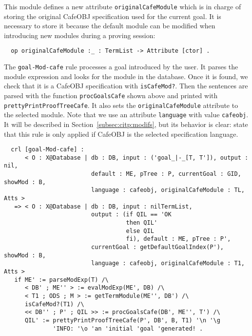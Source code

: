 This module defines a new attribute \verb"originalCafeModule" which is in charge of
storing the original CafeOBJ specification used for the current goal. It is necessary
to store it because the default module can be modified when introducing new modules
during a proving session:

{\codesize
\begin{verbatim}
  op originalCafeModule :_ : TermList -> Attribute [ctor] .
\end{verbatim}
}

The \verb"goal-Mod-cafe" rule processes a goal introduced by the user. It parses the
module expression and looks for the module in the database. Once it is found, we
check that it is a CafeOBJ specification with \verb"isCafeMod?". Then the sentences
are parsed with the function \verb"procGoalsCafe" shown above and printed with
\verb"prettyPrintProofTreeCafe". It also sets the \texttt{originalCafeModule}
attribute to the selected module.
%
Note that we use an attribute \verb"language" with value \texttt{cafeobj}. It will be
described in Section~\ref{subsec:citp:modifs}, but its behavior is clear: state that
this rule is only applied if CafeOBJ is the selected specification language.


{\codesize
\begin{verbatim}
  crl [goal-Mod-cafe] :
      < O : X@Database | db : DB, input : ('goal_|-_[T, T']), output : nil,
                         default : ME, pTree : P, currentGoal : GID, showMod : B,
                         language : cafeobj, originalCafeModule : TL, Atts >
   => < O : X@Database | db : DB, input : nilTermList,
                         output : (if QIL == 'OK
                                   then QIL'
                                   else QIL
                                   fi), default : ME, pTree : P',
                         currentGoal : getDefaultGoalIndex(P'), showMod : B,
                         language : cafeobj, originalCafeModule : T1, Atts >
   if ME' := parseModExp(T) /\
      < DB' ; ME'' > := evalModExp(ME', DB) /\
      < T1 ; ODS ; M > := getTermModule(ME'', DB') /\
      isCafeMod?(T1) /\
      << DB'' ; P' ; QIL >> := procGoalsCafe(DB', ME'', T') /\
      QIL' := prettyPrintProofTreeCafe(P', DB', B, T1) '\n '\g
              'INFO: '\o 'an 'initial 'goal 'generated! .
\end{verbatim}
}

